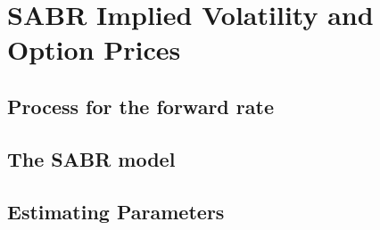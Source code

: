 \section{SABR Implied Volatility and Option Prices}



\subsection{Process for the forward rate}


\subsection{The SABR model}

\subsection{Estimating Parameters}